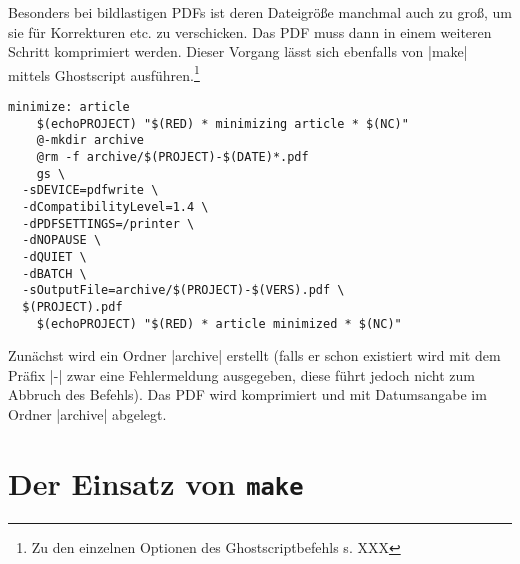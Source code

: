 \documentclass[ngerman]{dtk}
\begin{document}
Besonders bei bildlastigen PDFs ist deren Dateigröße manchmal auch zu groß,
um sie für Korrekturen etc. zu verschicken.
Das PDF muss dann in einem weiteren Schritt komprimiert werden.
Dieser Vorgang lässt sich ebenfalls von |make| mittels Ghostscript ausführen.\footnote{Zu den einzelnen Optionen des Ghostscriptbefehls s. XXX}

\begin{lstlisting}[style=number]
minimize: article
	$(echoPROJECT) "$(RED) * minimizing article * $(NC)"
	@-mkdir archive
	@rm -f archive/$(PROJECT)-$(DATE)*.pdf
	gs \
  -sDEVICE=pdfwrite \
  -dCompatibilityLevel=1.4 \
  -dPDFSETTINGS=/printer \
  -dNOPAUSE \
  -dQUIET \
  -dBATCH \
  -sOutputFile=archive/$(PROJECT)-$(VERS).pdf \
  $(PROJECT).pdf
	$(echoPROJECT) "$(RED) * article minimized * $(NC)"
\end{lstlisting}
Zunächst wird ein Ordner |archive| erstellt (falls er schon existiert wird mit dem Präfix |-| zwar eine Fehlermeldung ausgegeben, diese führt jedoch nicht zum Abbruch des Befehls). Das PDF wird komprimiert und mit Datumsangabe im Ordner |archive| abgelegt.




\section{Der Einsatz von \texttt{make}}
\end{document}
